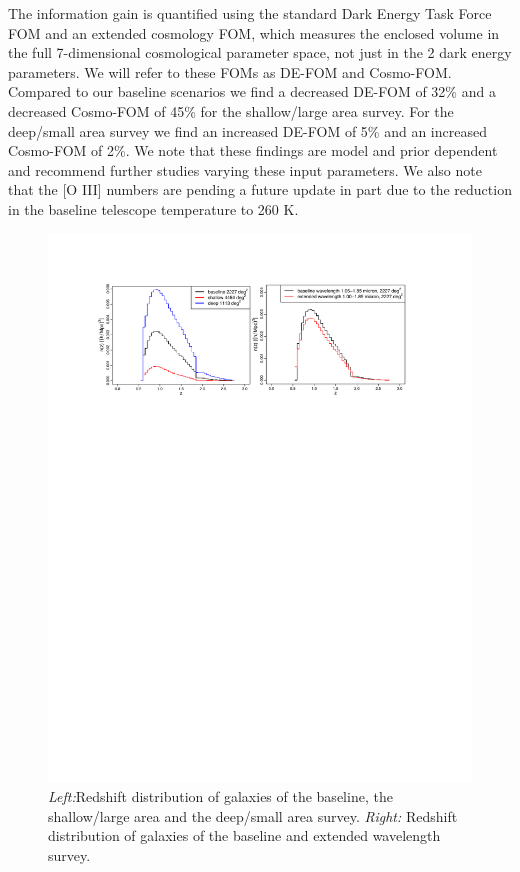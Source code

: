 The information gain is quantified using the standard Dark Energy Task Force FOM and an extended cosmology FOM, which measures the enclosed volume in the full 7-dimensional cosmological parameter space, not just in the 2 dark energy parameters. We will refer to these FOMs as DE-FOM and Cosmo-FOM. 
Compared to our baseline scenarios we find a decreased DE-FOM of 32\% and a decreased Cosmo-FOM of 45\% for the shallow/large area survey. For the deep/small area survey we find an increased DE-FOM of 5\% and an increased Cosmo-FOM of 2\%. We note that these findings are model and prior dependent and recommend further studies varying these input parameters. We also note that the [O III] numbers are pending a future update in part due to the reduction in the baseline telescope temperature to 260 K.
\begin{figure}
  \includegraphics[width=16.0cm]{Plots/forecasts/HLSS_forecasts}
    \caption{\textit{Left:}Redshift distribution of galaxies of the baseline, the shallow/large area and the deep/small area survey. \textit{Right:} Redshift distribution of galaxies of the baseline and extended wavelength survey. 
}
  \label{fi:forecast1}
\end{figure}

